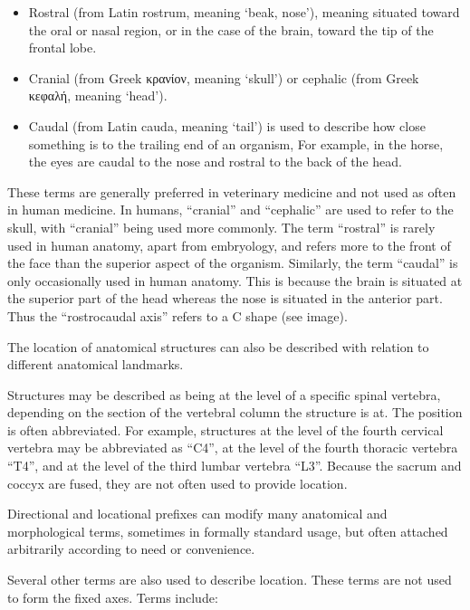 \begin{itemize}
\tightlist
\item
  Rostral (from Latin rostrum, meaning `beak, nose'), meaning situated toward the oral or nasal region, or in the case of the brain, toward the tip of the frontal lobe.
\item
  Cranial (from Greek κρανίον, meaning `skull') or cephalic (from Greek κεφαλή, meaning `head').
\item
  Caudal (from Latin cauda, meaning `tail') is used to describe how close something is to the trailing end of an organism,
  For example, in the horse, the eyes are caudal to the nose and rostral to the back of the head.
\end{itemize}

These terms are generally preferred in veterinary medicine and not used as often in human medicine. In humans, ``cranial'' and ``cephalic'' are used to refer to the skull, with ``cranial'' being used more commonly. The term ``rostral'' is rarely used in human anatomy, apart from embryology, and refers more to the front of the face than the superior aspect of the organism. Similarly, the term ``caudal'' is only occasionally used in human anatomy. This is because the brain is situated at the superior part of the head whereas the nose is situated in the anterior part. Thus the ``rostrocaudal axis'' refers to a C shape (see image).

The location of anatomical structures can also be described with relation to different anatomical landmarks.

Structures may be described as being at the level of a specific spinal vertebra, depending on the section of the vertebral column the structure is at. The position is often abbreviated. For example, structures at the level of the fourth cervical vertebra may be abbreviated as ``C4'', at the level of the fourth thoracic vertebra ``T4'', and at the level of the third lumbar vertebra ``L3''. Because the sacrum and coccyx are fused, they are not often used to provide location.

Directional and locational prefixes can modify many anatomical and morphological terms, sometimes in formally standard usage, but often attached arbitrarily according to need or convenience.

Several other terms are also used to describe location. These terms are not used to form the fixed axes. Terms include:


